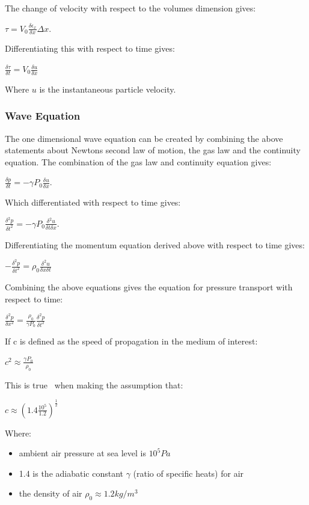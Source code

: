 The change of velocity with respect to the volumes dimension gives:
\begin{center}
$\tau = V_0\frac{\delta \epsilon_x}{\delta x} \Delta x$.\\
\end{center}

Differentiating this with respect to time gives:
\begin{center}
 $\frac{\delta \tau}{\delta t} = V_0\frac{\delta u}{\delta x}$\\
\end{center}
Where $u$ is the instantaneous particle velocity.\\
\subsubsection{Wave Equation}
The one dimensional wave equation can be created by combining the above statements about Newtons second law of motion, the gas law and the continuity equation. The combination of the gas law and continuity equation gives:
\begin{center}
$\frac{\delta p}{\delta t} = -\gamma P_0\frac{\delta u}{\delta x}$.\\
\end{center} 

Which differentiated with respect to time gives:
\begin{center}
$\frac{\delta^2 p}{\delta t^2} = -\gamma P_0\frac{\delta^2 u}{\delta t \delta x}$.\\
\end{center} 

Differentiating the momentum equation derived above with respect to time gives:
\begin{center}
 $-\frac{\delta^2 p}{\delta t^2}=\rho_0\frac{\delta^2 u}{\delta x \delta t}$\\
\end{center}

Combining the above equations gives the equation for pressure transport with respect to time:
\begin{center}
 $\frac{\delta^2 p}{\delta x^2}=\frac{\rho_0}{\gamma P_0}\frac{\delta^2 p}{\delta t^2} $\\
\end{center}

If c is defined as the speed of propagation in the medium of interest:
\begin{center}
$c^2\approx \frac{\gamma P_0}{\rho_0}$\\
\end{center} 
This is true~\cite{beranek1954acoustics} when making the assumption that:
\begin{center}
$c \approx (1.4\frac{10^5}{1.2})^\frac{1}{2}$\\
\end{center}
Where:
\begin{itemize}
\item ambient air pressure at sea level is $10^5Pa$
\item  1.4 is the adiabatic constant $\gamma$ (ratio of specific heats) for air
\item the density of air $\rho_0 \approx 1.2kg/m^3 $
\end{itemize}

